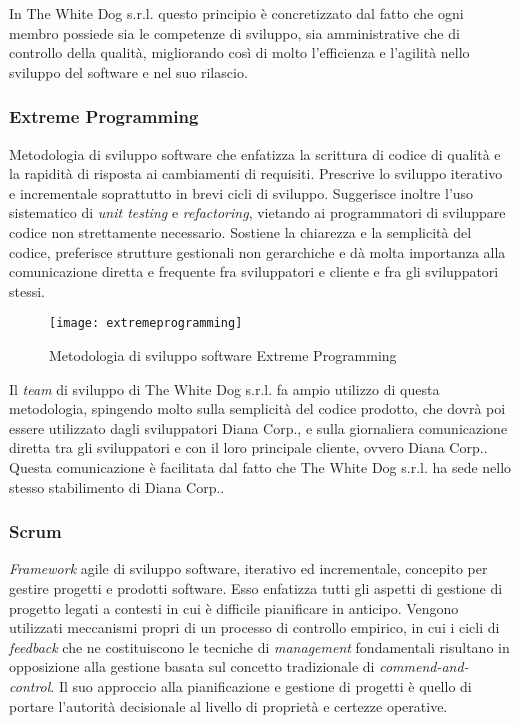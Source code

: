 In The White Dog s.r.l. questo principio è concretizzato dal fatto che ogni membro possiede sia le competenze di sviluppo, sia amministrative che di controllo della qualità, migliorando così di molto l'efficienza e l'agilità nello sviluppo del software e nel suo rilascio.

\subsubsection{Extreme Programming}

Metodologia di sviluppo software che enfatizza la scrittura di codice di qualità e la rapidità di risposta ai cambiamenti di requisiti. Prescrive lo sviluppo iterativo e incrementale soprattutto in brevi cicli di sviluppo. Suggerisce inoltre l'uso sistematico di \textit{unit testing} e \textit{refactoring}, vietando ai programmatori di sviluppare codice non strettamente necessario. Sostiene la chiarezza e la semplicità del codice, preferisce strutture gestionali non gerarchiche e dà molta importanza  alla comunicazione diretta e frequente fra sviluppatori e cliente e fra gli sviluppatori stessi. 

\label{Extreme Programming}
\begin{figure}[ht]
	\begin{center}
		\texttt{[image: extremeprogramming]}
		\caption{Metodologia di sviluppo software Extreme Programming}
	\end{center}
\end{figure}
\FloatBarrier

Il \textit{team} di sviluppo di The White Dog s.r.l. fa ampio utilizzo di questa metodologia, spingendo molto sulla semplicità del codice prodotto, che dovrà poi essere utilizzato dagli sviluppatori Diana Corp., e sulla giornaliera comunicazione diretta tra gli sviluppatori e con il loro principale cliente, ovvero Diana Corp.. Questa comunicazione è facilitata dal fatto che The White Dog s.r.l. ha sede nello stesso stabilimento di Diana Corp..

\subsubsection{Scrum}

\textit{Framework} agile di sviluppo software, iterativo ed incrementale, concepito per gestire progetti e prodotti software. Esso enfatizza tutti gli aspetti di gestione di progetto legati a contesti in cui è difficile pianificare in anticipo. Vengono utilizzati meccanismi propri di un processo di controllo empirico, in cui i cicli di \textit{feedback} che ne costituiscono le tecniche di \textit{management} fondamentali risultano in opposizione alla gestione basata sul concetto tradizionale di \textit{commend-and-control}. Il suo approccio alla pianificazione e gestione di progetti è quello di portare l'autorità decisionale al livello di proprietà e certezze operative.


